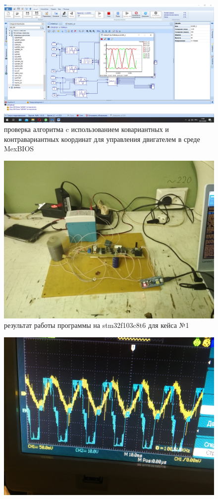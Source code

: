 \begin{figure}[ht!]
\centering
\includegraphics[width=1.0\linewidth]{custom_scope}
\caption{проверка алгоритма c использованием ковариантных и контравариантных координат для управления двигателем в среде MexBIOS}
\end{figure}

\newpage
\begin{figure}[ht!]
\centering
\includegraphics[width=0.9\linewidth]{IMG_20181222_105931}
\caption{результат работы программы на stm32f103c8t6 для кейса №1}
\end{figure}
\begin{figure}[ht!]
\centering
\includegraphics[width=0.9\linewidth]{4IMG_3171}
\caption{\color{yellow}{фазный ток} \color{black}{и} \color{blue}{линейное напряжение} \color{black}{на выходе инвертора}}
\end{figure}

